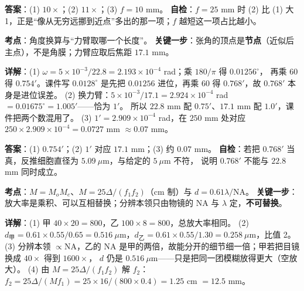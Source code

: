 ﻿\documentclass[11pt]{ctexart}
\renewcommand{\qbreak}{\needspace{0.45\textheight}}
\begin{document}
\textbf{答案}：(1) $10\times$；(2) $11\times$；(3) $f=10$ mm。\quad
\textbf{自检}：$f=25$ mm 时 (2) 比 (1) 大 1，正是“像从无穷远挪到近点”多出的那一项；$f$ 越短这一项占比越小。

\qbreak
{}
\textbf{考点}：角度换算与“力臂取哪一个长度”。\quad
\textbf{关键一步}：张角的顶点是\textbf{节点}（近似后主点），不是角膜；力臂应取后焦距 $17.1$ mm。

\textbf{详解}：(1) $\omega=5\times10^{-3}/22.8=2.193\times10^{-4}$ rad；乘 $180/\pi$ 得 $0.01256^\circ$，
再乘 60 得 $0.754'$。课件写 $0.0128^\circ$ 是先把 $0.01256$ 进位，再乘 60 得 $0.768'$，故 $0.768'$ 本身是进位误差。
(2) 换力臂：$5\times10^{-3}/17.1=2.924\times10^{-4}$ rad $=0.01675^\circ=1.005'$——恰为 $1'$。
所以 $22.8$ mm 配 $0.75'$、$17.1$ mm 配 $1.0'$，课件把两个数混用了。
(3) $1'=2.909\times10^{-4}$ rad，在 $250$ mm 处对应 $250\times2.909\times10^{-4}=0.0727$ mm $\approx0.07$ mm。

\textbf{答案}：(1) $0.754'$；(2) $1'$ 对应 $17.1$ mm；(3) 约 $0.07$ mm。\quad
\textbf{自检}：若把 $0.768'$ 当真，反推细胞直径为 $5.09\ \mu\mathrm{m}$，与给定的 $5\ \mu\mathrm{m}$ 不符，
说明 $0.768'$ 不能与 $22.8$ mm 同时成立。

\qbreak
{}
\textbf{考点}：$M=M_oM_e$、$M=25\Delta/(f_1f_2)$（cm 制）与 $d=0.61\lambda/\mathrm{NA}$。
\textbf{关键一步}：放大率是乘积、可以互相替换；分辨本领只由物镜的 NA 与 $\lambda$ 定，\textbf{不可替换}。

\textbf{详解}：(1) 甲 $40\times20=800$，乙 $100\times8=800$，总放大率相同。
(2) $d_{\text{甲}}=0.61\times0.55/0.65=0.516\ \mu\mathrm{m}$，$d_{\text{乙}}=0.61\times0.55/1.30=0.258\ \mu\mathrm{m}$，比值 2。
(3) 分辨本领 $\propto\mathrm{NA}$，乙的 NA 是甲的两倍，故能分开的细节细一倍；甲若把目镜换成 $40\times$ 得到 $1600\times$，
$d$ 仍是 $0.516\ \mu\mathrm{m}$——只是把同一团模糊放得更大（空放大）。
(4) 由 $M=25\Delta/(f_1f_2)$ 解 $f_2$：$f_2=25\Delta/(Mf_1)=25\times16/(800\times0.4)=1.25$ cm $=12.5$ mm。
\end{document}

